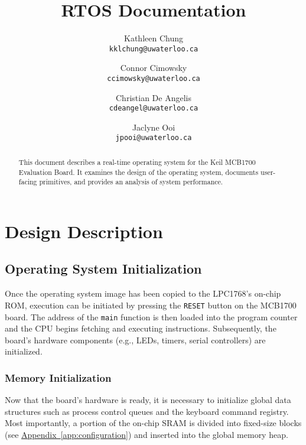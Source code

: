 \documentclass[12pt]{report}
\begin{document}
\title{RTOS Documentation}

\author{
    Kathleen Chung\\
    \texttt{kklchung@uwaterloo.ca}
    \and
    Connor Cimowsky\\
    \texttt{ccimowsky@uwaterloo.ca}
    \and
    Christian De Angelis\\
    \texttt{cdeangel@uwaterloo.ca}
    \and
    Jaclyne Ooi\\
    \texttt{jpooi@uwaterloo.ca}
}

\maketitle

\begin{abstract}

This document describes a real-time operating system for the Keil MCB1700 Evaluation Board. It examines the design of the operating system, documents user-facing primitives, and provides an analysis of system performance.

\end{abstract}

\tableofcontents

\listofalgorithms

\listoffigures

\chapter{Design Description}

\section{Operating System Initialization}

Once the operating system image has been copied to the LPC1768's on-chip ROM, execution can be initiated by pressing the \texttt{RESET} button on the MCB1700 board. The address of the \texttt{main} function is then loaded into the program counter and the CPU begins fetching and executing instructions. Subsequently, the board's hardware components (e.g., LEDs, timers, serial controllers) are initialized.

\subsection{Memory Initialization}

Now that the board's hardware is ready, it is necessary to initialize global data structures such as process control queues and the keyboard command registry. Most importantly, a portion of the on-chip SRAM is divided into fixed-size blocks (see \hyperref[app:configuration]{Appendix~\ref*{app:configuration}}) and inserted into the global memory heap.
\end{document}
